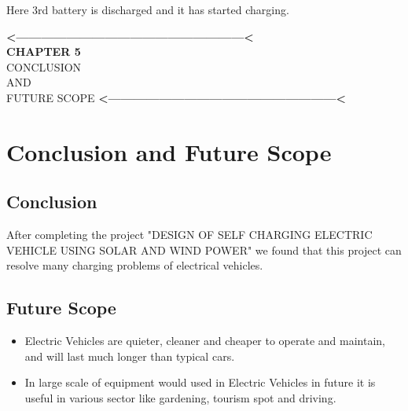 \documentclass[a4paper,12pt]{article}
\begin{document}
Here 3rd battery is discharged and it has started charging.\\

\newpage
\newpage
\thispagestyle{empty}
\vspace*{0.25\textheight}
\begin{center}
\begin{center}
{\bfseries\LARGE <------------------------------------------------------<}\\
{\bfseries\LARGE CHAPTER 5}\\[2cm]


{\scshape\Huge CONCLUSION}\\[0.5cm]
{\scshape\Huge AND}\\[0.5cm]
{\scshape\Huge FUTURE SCOPE}
{\bfseries\LARGE <------------------------------------------------------<}
\end{center}
\end{center}
\newpage

\section{Conclusion and Future Scope}

\subsection{Conclusion}
After completing the project "DESIGN OF SELF CHARGING ELECTRIC VEHICLE USING SOLAR AND WIND POWER" we found that this project can resolve many charging problems of electrical vehicles. 

\subsection{Future Scope}
\begin{itemize}
\item Electric Vehicles are quieter, cleaner and cheaper to operate and maintain, and will last much longer than typical cars.

\item In large scale of equipment would used in Electric Vehicles in future it is useful in various sector like gardening, tourism spot and driving.
\end{itemize}
\end{document}

